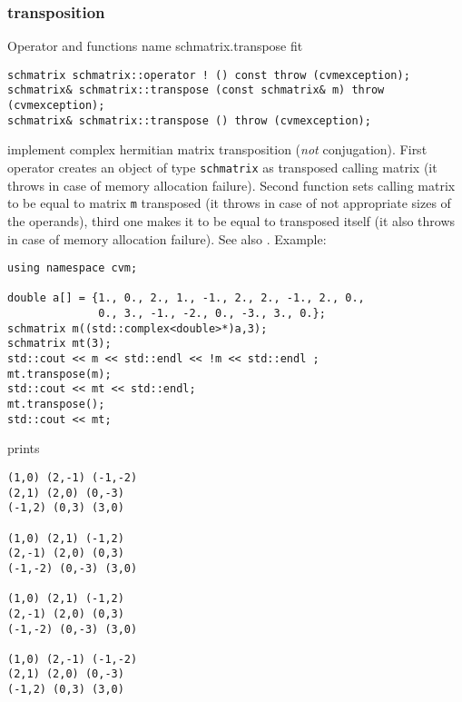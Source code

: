 \subsubsection{transposition}
Operator and functions%
\pdfdest name {schmatrix.transpose} fit
\begin{verbatim}
schmatrix schmatrix::operator ! () const throw (cvmexception);
schmatrix& schmatrix::transpose (const schmatrix& m) throw (cvmexception);
schmatrix& schmatrix::transpose () throw (cvmexception);
\end{verbatim}
implement complex hermitian matrix transposition (\emph{not} conjugation).
First operator creates an object of type \verb"schmatrix" as
 transposed calling matrix
(it throws  
in case of memory allocation failure). 
Second function sets  calling matrix to be equal to  matrix
\verb"m" transposed
(it throws  
in case of not appropriate sizes of the operands), 
third one makes it to be equal to
transposed itself (it also throws  
in case of memory allocation failure). 
See also .
Example:
\begin{Verbatim}
using namespace cvm;

double a[] = {1., 0., 2., 1., -1., 2., 2., -1., 2., 0.,
              0., 3., -1., -2., 0., -3., 3., 0.};
schmatrix m((std::complex<double>*)a,3);
schmatrix mt(3);
std::cout << m << std::endl << !m << std::endl ;
mt.transpose(m);
std::cout << mt << std::endl;
mt.transpose();
std::cout << mt;
\end{Verbatim}
prints
\begin{Verbatim}
(1,0) (2,-1) (-1,-2)
(2,1) (2,0) (0,-3)
(-1,2) (0,3) (3,0)

(1,0) (2,1) (-1,2)
(2,-1) (2,0) (0,3)
(-1,-2) (0,-3) (3,0)

(1,0) (2,1) (-1,2)
(2,-1) (2,0) (0,3)
(-1,-2) (0,-3) (3,0)

(1,0) (2,-1) (-1,-2)
(2,1) (2,0) (0,-3)
(-1,2) (0,3) (3,0)
\end{Verbatim}
\newpage




